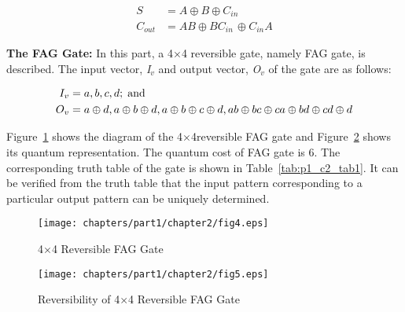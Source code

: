\begin{align*}
S &= A \oplus B \oplus C{}_{in}\\
C{}_{out} &= AB \oplus BC{}_{in\ }\oplus C{}_{in}A
\end{align*}

\noindent\textbf{The FAG Gate:} In this part, a {4$\times$4} reversible gate, namely FAG gate, is described. The input vector, {\it I${}_{v}$} and output vector, {\it O${}_{v}$} of the gate are as follows:

\begin{align*}
I_{v} &= {a, b, c, d}; \;\textnormal{and}\\
O_{v} &= {a\oplus d, a\oplus b\oplus d, a\oplus b\oplus c\oplus d, ab\oplus bc\oplus ca\oplus bd\oplus cd\oplus d}
\end{align*}

Figure~\ref{fig:p1_c2_fig4} shows the diagram of the {4$\times$4}reversible FAG gate and Figure~\ref{fig:p1_c2_fig5} shows its quantum representation. The quantum cost of FAG gate is 6. The corresponding truth table of the gate is shown in Table~\ref{tab:p1_c2_tab1}. It can be verified from the truth table that the input pattern corresponding to a particular output pattern can be uniquely determined.

\begin{figure}[!tbh]
\centering
\texttt{[image: chapters/part1/chapter2/fig4.eps]}
\caption{{4$\times$4} Reversible FAG Gate}
\label{fig:p1_c2_fig4}
\end{figure}

\begin{figure}[!tbh]
\centering
\texttt{[image: chapters/part1/chapter2/fig5.eps]}
\caption{Reversibility of {4${\times}$4} Reversible FAG Gate}
\label{fig:p1_c2_fig5}
\end{figure}

